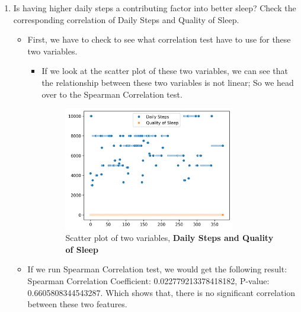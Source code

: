 \documentclass{article}
\begin{document}
\begin{enumerate}
\begin{enumerate}[label=(\alph*)]
        \item Is having higher daily steps a contributing factor into better sleep? Check the corresponding correlation of Daily Steps and Quality of Sleep.
        \begin{itemize}
            \item First, we have to check to see what correlation test have to use for these two variables.
            \begin{itemize}
                \item If we look at the scatter plot of these two variables, we can see that the relationship between these two variables is not linear; So we head over to the Spearman Correlation test.
                \begin{figure}[H]  %

                    \centering
                    \includegraphics[width=0.8\textwidth]{./images/health_scatter_plot_of_daily_steps_quality_of_sleep.png}  %
                    \caption{Scatter plot of two variables, \textbf{Daily Steps and Quality of Sleep}}
                    \label{fig:Figure_4}  %
        
                \end{figure}
            \end{itemize}

            \item If we run Spearman Correlation test, we would get the following result: Spearman Correlation Coefficient: 0.022779213378418182, P-value: 0.6605808344543287. Which shows that, there is no significant correlation between these two features. 
        \end{itemize}


\end{enumerate}
\end{enumerate}
\end{document}
